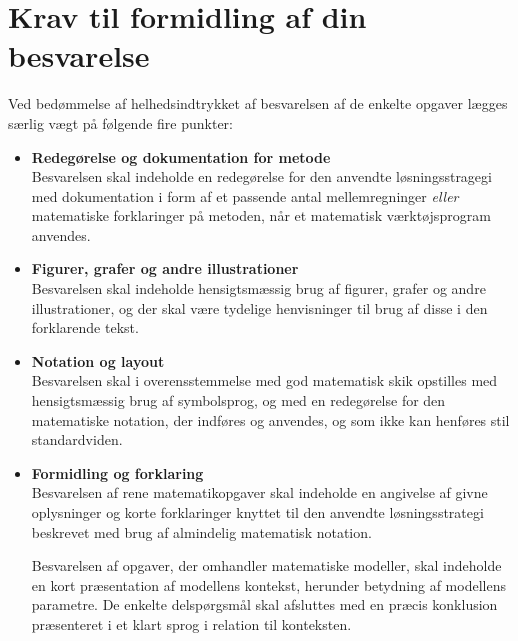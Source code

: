 \documentclass[12pt,x11names,a4paper]{article}
\begin{document}
\section*{Krav til formidling af din besvarelse}

Ved bedømmelse af helhedsindtrykket af besvarelsen af de enkelte opgaver lægges særlig vægt på følgende fire punkter:
\begin{itemize}
\item[$\cdot$] \textbf{Redegørelse og dokumentation for metode} \\
Besvarelsen skal indeholde en redegørelse for den anvendte løsningsstragegi med dokumentation i form af et passende antal mellemregninger \textit{eller} matematiske forklaringer på metoden, når et matematisk værktøjsprogram anvendes.
\item[$\cdot$] \textbf{Figurer, grafer og andre illustrationer} \\
Besvarelsen skal indeholde hensigtsmæssig brug af figurer, grafer og andre illustrationer, og der skal være tydelige henvisninger til brug af disse i den forklarende tekst.
\item[$\cdot$] \textbf{Notation og layout}\\
Besvarelsen skal i overensstemmelse med god matematisk skik opstilles med hensigtsmæssig brug af symbolsprog, og med en redegørelse for den matematiske notation, der indføres og anvendes, og som ikke kan henføres stil standardviden.
\item[$\cdot$] \textbf{Formidling og forklaring}\\
Besvarelsen af rene matematikopgaver skal indeholde en angivelse af givne oplysninger og korte forklaringer knyttet til den anvendte løsningsstrategi beskrevet med brug af almindelig matematisk notation. 

Besvarelsen af opgaver, der omhandler matematiske modeller, skal indeholde en kort præsentation af modellens kontekst, herunder betydning af modellens parametre. De enkelte delspørgsmål skal afsluttes med en præcis konklusion præsenteret i et klart sprog i relation til konteksten.
\end{itemize}

\newpage


\end{document}
